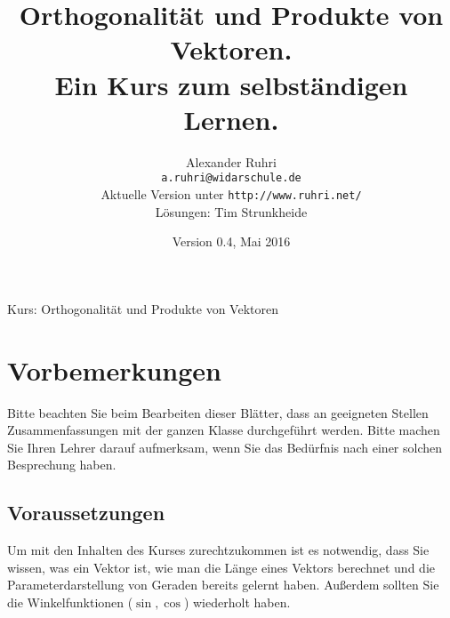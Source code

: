 \documentclass[12pt,a4paper,twoside,fleqn]{article}
\begin{document}
\newcommand{\Vektor}[2]{\begin{pmatrix} #1 \\ #2 \end{pmatrix}}
\newcommand{\vektor}[3] {\begin{pmatrix} #1 \\ #2 \\ #3 \end{pmatrix}}
\newcommand{\umf}[1]{\qquad\left|#1\right.}
\newcommand{\uu}[1]{\underline{\underline{#1}}}

\renewcommand{\thepage}{Seite~\arabic{page}}
\renewcommand{\baselinestretch}{1.2}

\renewcommand{\labelenumi}{{\bf\arabic{enumi}.)}}
\renewcommand{\labelenumii}{{\bf\alph{enumii})}}
\renewcommand{\labelenumiii}{{\bf\roman{enumiii})}}

\renewcommand{\thecolumn}{{\bf\alph{column}\ }}
\newcommand{\labelcolumn}{{\bf\alph{column})\ \ \ }}
\setlength{\itemsep}{0pt}
\setlength{\mathindent}{0cm}


\pagestyle{myheadings}
%
{Kurs: Orthogonalität und Produkte von Vektoren\hfill}
\title{Orthogonalität und Produkte von Vektoren.\\\large{Ein Kurs
  zum selbständigen Lernen.}}
\author{Alexander Ruhri\\
  \small\texttt{a.ruhri@widarschule.de}\\
  \small Aktuelle Version unter \texttt{http://www.ruhri.net/}\\
  \small Lösungen: Tim Strunkheide}
\date{\small Version 0.4, Mai 2016}
\maketitle
\section*{Vorbemerkungen}
Bitte beachten Sie beim Bearbeiten dieser Blätter, dass an geeigneten
Stellen Zusammenfassungen mit der ganzen Klasse durchgeführt
werden. Bitte machen Sie Ihren Lehrer darauf aufmerksam, wenn Sie das
Bedürfnis nach einer solchen Besprechung haben. 
\subsection*{Voraussetzungen}
Um mit den Inhalten des Kurses zurechtzukommen ist es notwendig,
dass Sie wissen, was ein Vektor ist, wie man die Länge eines Vektors
berechnet und die Parameterdarstellung von Geraden bereits gelernt
haben. Außerdem sollten Sie die Winkelfunktionen ($\sin, \cos$)
wiederholt haben.
\end{document}
